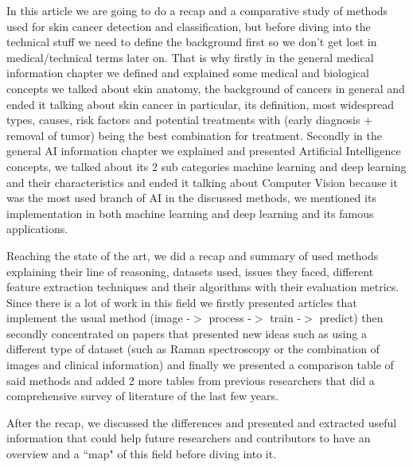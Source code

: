 In this article we are going to do a recap and a comparative study of methods used for skin cancer detection and classification, but before diving into the technical stuff we need to define the background first so we don't get lost in medical/technical terms later on. That is why firstly in the general medical information chapter we defined and explained some medical and biological concepts we talked about skin anatomy, the background of cancers in general and ended it talking about skin cancer in particular, its definition, most widespread types, causes, risk factors and potential treatments with (early diagnosis + removal of tumor) being the best combination for treatment. Secondly in the general AI information chapter we explained and presented Artificial Intelligence concepts, we talked about its 2 sub categories machine learning and deep learning and their characteristics and ended it talking about Computer Vision because it was the most used branch of AI in the discussed methods, we mentioned its implementation in both machine learning and deep learning and its famous applications.

Reaching the state of the art, we did a recap and summary of used methods explaining their line of reasoning, datasets used, issues they faced, different feature extraction techniques and their algorithms with their evaluation metrics. Since there is a lot of work in this field we firstly presented articles that implement the usual method (image -$>$ process -$>$ train -$>$ predict) then secondly concentrated on papers that presented new ideas such as using a different type of dataset (such as Raman spectroscopy or the combination of images and clinical information) and finally we presented a comparison table of said methods and added 2 more tables from previous researchers that did a comprehensive survey of literature of the last few years.

After the recap, we discussed the differences and presented and extracted useful information that could help future researchers and contributors to have an overview and a ``map" of this field before diving into it. 